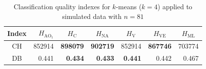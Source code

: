 \documentclass[journal]{IEEEtran}
\begin{document}
\begin{table}[htbp]
  \centering
  \caption{Classification quality indexes for $k$-means ($k=4$) applied to simulated data with $n=81$}
  \label{tab:CHyDB_synt}
    \begin{tabular}{crrrrrr}
    \midrule
    Index   & $H_{{\text{AO}}_1}$ & \multicolumn{1}{c}{$H_\text{C}$} & \multicolumn{1}{c}{$H_{\text{NA}}$} & \multicolumn{1}{c}{$H_\text{V}$} & \multicolumn{1}{c}{$H_{\text{VE}}$} & \multicolumn{1}{c}{$H_{\text{ML}}$} \\
    \midrule
    CH	&	852914	&	\textbf{898079}	&	\textbf{902719}	&	852914	&	\textbf{867746}	&	703774	\\
     DB	&	0.441	&	\textbf{0.434}	&	\textbf{0.433}	&	\textbf{0.441}	&	0.442	&	0.467	\\

    \midrule
   
    \end{tabular}%
  \label{tab:addlabel}
\end{table}%
\end{document}
